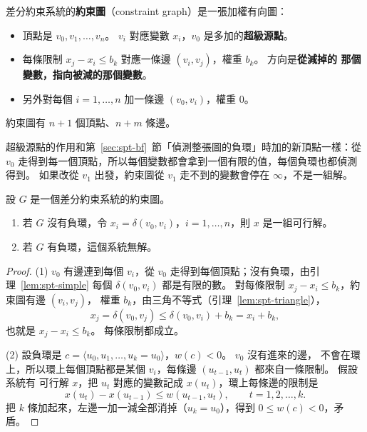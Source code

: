 \begin{definition}[約束圖]
\label{def:spt-cgraph}
差分約束系統的\textbf{約束圖}（constraint graph）是一張加權有向圖：
\begin{itemize}
\item 頂點是 $v_0, v_1, \ldots, v_n$。 $v_i$ 對應變數 $x_i$，$v_0$ 是多加的\textbf{超級源點}。
\item 每條限制 $x_j - x_i \le b_k$ 對應一條邊 $(v_i, v_j)$，權重 $b_k$。 方向是\textbf{從減掉的
那個變數，指向被減的那個變數}。
\item 另外對每個 $i = 1, \ldots, n$ 加一條邊 $(v_0, v_i)$，權重 $0$。
\end{itemize}
約束圖有 $n + 1$ 個頂點、$n + m$ 條邊。
\end{definition}

超級源點的作用和第~\ref{sec:spt-bf}~節「偵測整張圖的負環」時加的新頂點一樣：從 $v_0$ 走得到每一個頂點，所以每個變數都會拿到一個有限的值，每個負環也都偵測得到。 如果改從 $v_1$
出發，約束圖從 $v_1$ 走不到的變數會停在 $\infty$，不是一組解。

\begin{theorem}
\label{thm:spt-diff}
設 $G$ 是一個差分約束系統的約束圖。
\begin{enumerate}
\item 若 $G$ 沒有負環，令 $x_i = \delta(v_0, v_i)$，$i = 1, \ldots, n$，則 $x$ 是一組可行解。
\item 若 $G$ 有負環，這個系統無解。
\end{enumerate}
\end{theorem}

\begin{proof}
(1) $v_0$ 有邊連到每個 $v_i$，從 $v_0$ 走得到每個頂點；沒有負環，由引理~\ref{lem:spt-simple}
每個 $\delta(v_0, v_i)$ 都是有限的數。 對每條限制 $x_j - x_i \le b_k$，約束圖有邊 $(v_i, v_j)$，
權重 $b_k$，由三角不等式（引理~\ref{lem:spt-triangle}），
\[
x_j = \delta(v_0, v_j) \le \delta(v_0, v_i) + b_k = x_i + b_k ,
\]
也就是 $x_j - x_i \le b_k$。 每條限制都成立。

(2) 設負環是 $c = \langle u_0, u_1, \ldots, u_k = u_0 \rangle$，$w(c) < 0$。 $v_0$ 沒有進來的邊，
不會在環上，所以環上每個頂點都是某個 $v_i$，每條邊 $(u_{t-1}, u_t)$ 都來自一條限制。 假設系統有
可行解 $x$，把 $u_t$ 對應的變數記成 $x(u_t)$，環上每條邊的限制是
\[
x(u_t) - x(u_{t-1}) \le w(u_{t-1}, u_t), \qquad t = 1, 2, \ldots, k .
\]
把 $k$ 條加起來，左邊一加一減全部消掉（$u_k = u_0$），得到 $0 \le w(c) < 0$，矛盾。
\end{proof}

